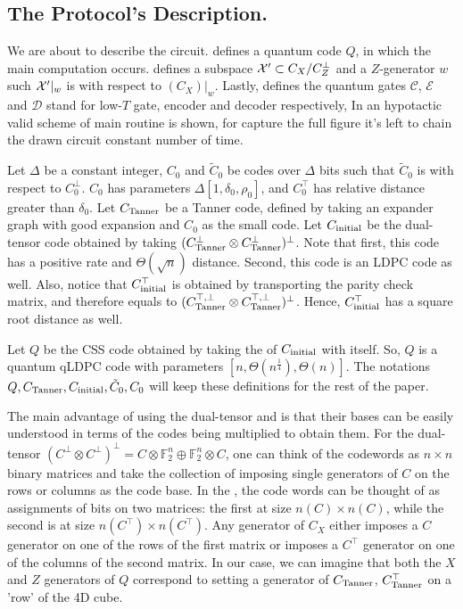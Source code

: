 \subsection{The Protocol's Description.} 
We are about to describe the circuit.  defines a quantum code $Q$, in which the main computation occurs.  defines a subspace $\mathcal{X}^\prime \subset C_{X}/C_{Z}^\perp$ and a $Z$-generator $w$ such $\mathcal{X}^\prime|_{w}$ is \trig with respect to $(C_{X})|_{w}$. Lastly,  defines the quantum gates $\mathcal{C}$, $\mathcal{E}$ and $\mathcal{D}$ stand for low-$T$ gate, encoder and decoder respectively, In  an hypotactic valid scheme of main routine is shown, for capture the full figure it's left to chain the drawn circuit constant number of time.  
\begin{definition}
  \label{def:thecode}
Let $\Delta$ be a constant integer, $C_{0}$ and $\tilde{C}_{0}$ be codes over $\Delta$ bits such that $\tilde{C}_{0}$ is \trig with respect to $C^{\perp}_{0}$. $C_{0}$ has parameters $\Delta[1,\delta_{0},\rho_{0}]$, and $C_{0}^\top$ has relative distance greater than $\delta_{0}$. Let $C_{\text{Tanner}}$ be a Tanner code, defined by taking an expander graph with good expansion and $C_{0}$ as the small code. Let $C_{\text{initial}}$ be the dual-tensor code obtained by taking $(C_{\text{Tanner}}^\perp \otimes C_{\text{Tanner}}^\perp )^\perp$. Note that first, this code has a positive rate and $\Theta(\sqrt{n})$ distance. Second, this code is an LDPC code as well. Also, notice that $C_{\text{initial}}^{\top}$ is obtained by transporting the parity check matrix, and therefore equals to $(C_{\text{Tanner}}^{\top, \perp} \otimes C_{\text{Tanner}}^{\top, \perp} )^\perp$. Hence, $C_{\text{initial}}^{\top}$ has a square root distance as well.

Let $Q$ be the CSS code obtained by taking the \Hyp of $C_{\text{initial}}$ with itself. So, $Q$ is a quantum qLDPC code with parameters $[n, \Theta(n^{\frac{1}{4}}), \Theta(n)]$. The notations $Q,C_{\text{Tanner}}, C_{\text{initial}}, \tilde{C}_{0}, C_{0}$ will keep these definitions for the rest of the paper.
\end{definition}

The main advantage of using the dual-tensor and \Hyp is that their bases can be easily understood in terms of the codes being multiplied to obtain them. For the dual-tensor $(C^{\perp}\otimes C^{\perp})^{\perp} = C\otimes \mathbb{F}_{2}^{n} \oplus \mathbb{F}_{2}^{n} \otimes C$, one can think of the codewords as $n\times n$ binary matrices and take the collection of imposing single generators of $C$ on the rows or columns as the code base. In the \Hyp, the code words can be thought of as assignments of bits on two matrices: the first at size $n(C) \times n(C)$, while the second is at size $n(C^\top) \times n(C^\top)$. Any generator of $C_{X}$ either imposes a $C$ generator on one of the rows of the first matrix or imposes a $C^{\top}$ generator on one of the columns of the second matrix. In our case, we can imagine that both the $X$ and $Z$ generators of $Q$ correspond to setting a generator of $C_{\text{Tanner}}$, $C_{\text{Tanner}}^\top$ on a 'row' of the 4D cube.


